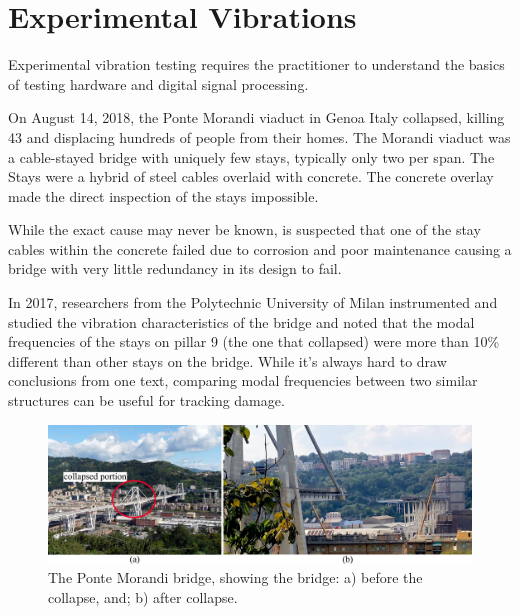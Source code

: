 \documentclass[12pt,letter]{article}
\begin{document}
	
	\setcounter{section}{7}	
	\setcounter{figure}{0}   
	\renewcommand\thefigure{\thesection.\arabic{figure}}
	\setcounter{equation}{0}   
	\renewcommand\theequation{\thesection.\arabic{equation}}

	\section{Experimental Vibrations}
	
Experimental vibration testing requires the practitioner to understand the basics of testing hardware and digital signal processing.


\begin{vibration_case_study}

	On August 14, 2018, the Ponte Morandi viaduct in Genoa Italy collapsed, killing 43 and displacing hundreds of people from their homes. The Morandi viaduct was a cable-stayed bridge with uniquely few stays, typically only two per span. The Stays were a hybrid of steel cables overlaid with concrete. The concrete overlay made the direct inspection of the stays impossible. 
	
	While the exact cause may never be known, is suspected that one of the stay cables within the concrete failed due to corrosion and poor maintenance causing a bridge with very little redundancy in its design to fail\protect\footnotemark[1].
	
	In 2017, researchers from the Polytechnic University of Milan instrumented and studied the vibration characteristics of the bridge and noted that the modal frequencies of the stays on pillar 9 (the one that collapsed) were more than 10\% different than other stays on the bridge. While it's always hard to draw conclusions from one text, comparing modal frequencies between two similar structures can be useful for tracking damage. 
 
	\begin{figure}[H]
		\centering
		\includegraphics[width=6in]{../figures/ponte_morandi_bridge}
		\caption{The Ponte Morandi bridge, showing the bridge: a) before the collapse\protect\footnotemark[2], and; b) after collapse\protect\footnotemark[3]. }
	\end{figure}
		
\end{vibration_case_study}
		
\end{document}

